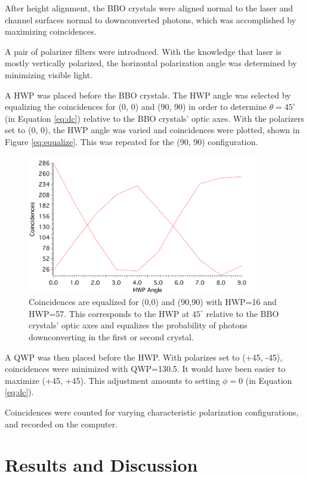 \documentclass{article}
\begin{document}
After height alignment, the BBO crystals were aligned normal to the laser and channel surfaces normal to downconverted photons, which was accomplished by maximizing coincidences.

A pair of polarizer filters were introduced. With the knowledge that laser is mostly vertically polarized, the horizontal polarization angle was determined by minimizing visible light.

A HWP was placed before the BBO crystals. The HWP angle was selected by equalizing the coincidences for (0, 0) and (90, 90) in order to determine $\theta = 45^{\circ}$ (in Equation \ref{eq:dc}) relative to the BBO crystals' optic axes. With the polarizers set to (0, 0), the HWP angle was varied and coincidences were plotted, shown in Figure \ref{eq:equalize}. This was repeated for the (90, 90) configuration.

\begin{figure}[!h]
  \centering
  \includegraphics[width=0.9\textwidth]{equalize}
  \caption{Coincidences are equalized for (0,0) and (90,90) with HWP=16 and HWP=57. This corresponds to the HWP at $45^{\circ}$ relative to the BBO crystals' optic axes and equalizes the probability of photons downconverting in the first or second crystal. \label{fig:equalize}}
\end{figure}

A QWP was then placed before the HWP. With polarizes set to (+45, -45), coincidences were minimized with QWP=130.5. It would have been easier to maximize (+45, +45). This adjustment amounts to setting $\phi = 0$ (in Equation \ref{eq:dc}).

Coincidences were counted for varying characteristic polarization configurations, and recorded on the computer.

\section{Results and Discussion}
\end{document}
